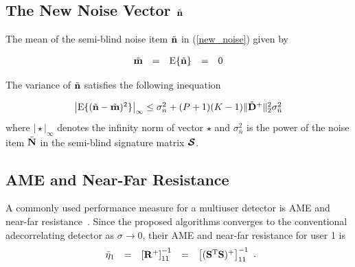 \documentclass[a4paper,10pt,fleqn, twocolumn]{IEEETran}
\newcommand{\bm}{{\bf m}}
\newcommand{\bn}{{\bf n}}
\newcommand{\bN}{{\bf N}}
\newcommand{\bS}{{\bf S}}
\newcommand{\bD}{{\bf D}}
\newcommand{\bR}{{\bf R}}
\newcommand{\bcS}{{\mbox {\boldmath ${\cal S}$}}}
\begin{document}
\subsection{The New Noise Vector $\tilde{\bn}$}
The mean of the semi-blind noise item $\tilde{\bn}$ in
(\ref{new_noise}) given by

\begin{equation}
\begin{array}{rcccl}
\tilde{\bm}&=&{\rm E}\{\tilde{\bn}\}&=&0
\end{array}
\end{equation}

\noindent The variance of $\tilde{\bn}$ satisfies the following
inequation

\begin{equation}\hspace{-0.0in}
\begin{array}{l}
\bigl|{\rm
E}\{(\tilde{\bn}-\tilde{\bm})^2\}\bigr|_{\infty}\leq\sigma_n^2+(P+1)(K-1)\|\tilde{\bD}^+\|_2^2\sigma_{\bar{n}}^2
\end{array} \label{noise_mean}
\end{equation}
\noindent where $\bigl|\star\bigr|_{\infty}$ denotes the infinity
norm of vector $\star$ and $\sigma_{\bar{n}}^2$ is the power of
the noise item $\bar{\bN}$ in the semi-blind signature matrix
$\bcS$.
\subsection{AME and Near-Far Resistance}
A commonly used performance measure for a multiuser detector is
AME and near-far resistance~\cite{Verd98}. Since the proposed
algorithms converges to the conventional adecorrelating detector
as $\sigma\rightarrow 0$, their AME and near-far resistance for
user 1 is
\begin{equation}
\begin{array}{rcccl}
\bar{\eta}_1&=&\left[\bR^{+}\right]_{11}^{-1}&=&\left[(\bS^{\rm
T}\bS)^{+}\right]_{11}^{-1}
\end{array}.
\end{equation}
\end{document}
